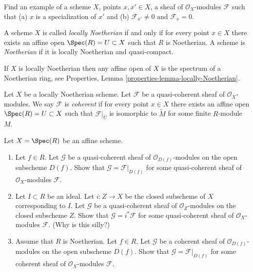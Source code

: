 \begin{exercise}
\label{exercise-O-module-specialization-points}
Find an example of a scheme $X$, points $x, x' \in X$,
a sheaf of $\mathcal{O}_X$-modules
$\mathcal{F}$ such that (a) $x$ is a specialization of $x'$ and (b)
$\mathcal{F}_{x'} \not = 0$ and $\mathcal{F}_x = 0$.
\end{exercise}

\begin{definition}
\label{definition-Noetherian-scheme}
A scheme $X$ is called {\it locally Noetherian} if and only if
for every point $x \in X$ there exists an affine open
$\Spec(R) = U \subset X$ such that $R$ is Noetherian.
A scheme is {\it Noetherian} if it is locally Noetherian and quasi-compact.
\end{definition}

\noindent
If $X$ is locally Noetherian then any affine open of $X$
is the spectrum of a Noetherian ring, see
Properties, Lemma \ref{properties-lemma-locally-Noetherian}.

\begin{definition}
\label{definition-coherent}
Let $X$ be a locally Noetherian scheme.
Let $\mathcal{F}$ be a quasi-coherent sheaf of
$\mathcal{O}_X$-modules. We say $\mathcal{F}$ is {\it coherent}
if for every point $x \in X$ there exists an affine open
$\Spec(R) = U \subset X$ such that $\mathcal{F}|_U$
is isomorphic to $\widetilde M$ for some finite $R$-module $M$.
\end{definition}

\begin{exercise}
\label{exercise-extend-quasi-coherent}
Let $X = \Spec(R)$ be an affine scheme.
\begin{enumerate}
\item Let $f \in R$. Let $\mathcal{G}$ be a
quasi-coherent sheaf of $\mathcal{O}_{D(f)}$-modules
on the open subscheme $D(f)$.
Show that $\mathcal{G} = \mathcal{F}|_{D(f)}$ for some
quasi-coherent sheaf of $\mathcal{O}_X$-modules
$\mathcal{F}$.
\item Let $I \subset R$ be an ideal.
Let $i : Z \to X$ be the closed subscheme of $X$ corresponding
to $I$. Let $\mathcal{G}$ be a
quasi-coherent sheaf of $\mathcal{O}_Z$-modules
on the closed subscheme $Z$.
Show that $\mathcal{G} = i^*\mathcal{F}$ for some
quasi-coherent sheaf of $\mathcal{O}_X$-modules $\mathcal{F}$.
(Why is this silly?)
\item Assume that $R$ is Noetherian.
Let $f \in R$. Let $\mathcal{G}$ be a
coherent sheaf of $\mathcal{O}_{D(f)}$-modules
on the open subscheme $D(f)$.
Show that $\mathcal{G} = \mathcal{F}|_{D(f)}$ for some
coherent sheaf of $\mathcal{O}_X$-modules $\mathcal{F}$.
\end{enumerate}
\end{exercise}

